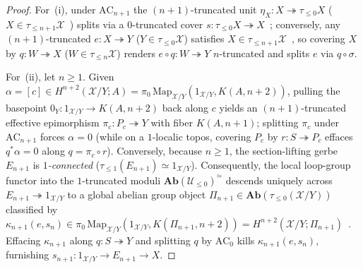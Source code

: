 \documentclass[10pt,twoside,openright]{book}
\theoremstyle{crmplain}
\theoremstyle{crmdef}
\theoremstyle{crmremark}
\begin{document}
\begin{proof}
For~(i), under $\mathrm{AC}_{n+1}$ the $(n+1)$-truncated unit $\eta_X : X \twoheadrightarrow \tau_{\le 0}X$ ($X \in \tau_{\le n+1}\mathcal{X}$~\cite[Lemma~5.5.6.15]{Lurie09}) splits via a $0$-truncated cover $s : \tau_{\le 0}X \twoheadrightarrow X$~\cite[Prop.~7.2.1.14]{Lurie09}; conversely, any $(n+1)$-truncated $e : X \twoheadrightarrow Y$ ($Y \in \tau_{\le 0}\mathcal{X}$) satisfies $X \in \tau_{\le n+1}\mathcal{X}$~\cite[Lemma~5.5.6.14]{Lurie09}, so covering $X$ by $q : W \twoheadrightarrow X$ ($W \in \tau_{\le n}\mathcal{X}$) renders $e \circ q : W \twoheadrightarrow Y$ $n$-truncated and splits $e$ via $q \circ \sigma$.

For~(ii), let $n \ge 1$. Given $\alpha = [c] \in H^{n+2}(\mathcal{X}/Y; A) =\allowbreak \pi_0\,\mathrm{Map}_{\mathcal{X}/Y}(1_{\mathcal{X}/Y},\allowbreak K(A, n+2))$, pulling the basepoint $0_Y : 1_{\mathcal{X}/Y} \to K(A, n+2)$ back along $c$ yields an $(n+1)$-truncated effective epimorphism $\pi_c : P_c \twoheadrightarrow Y$ with fiber $K(A, n+1)$; splitting $\pi_c$ under $\mathrm{AC}_{n+1}$ forces $\alpha = 0$ (while on a $1$-localic topos, covering $P_c$ by $r : S \twoheadrightarrow P_c$ effaces $q^*\alpha = 0$ along $q = \pi_c \circ r$). Conversely, because $n \ge 1$, the section-lifting gerbe $E_{n+1}$ is \emph{$1$-connected} ($\tau_{\le 1}(E_{n+1}) \simeq 1_{\mathcal{X}/Y}$). Consequently, the local loop-group functor into the $1$-truncated moduli $\mathbf{Ab}(\mathcal{U}_{\le 0})^\simeq$ descends uniquely across $E_{n+1} \twoheadrightarrow 1_{\mathcal{X}/Y}$ to a global abelian group object $\Pi_{n+1} \in \mathbf{Ab}(\tau_{\le 0}(\mathcal{X}/Y))$ classified by $\kappa_{n+1}(e, s_n) \in\allowbreak \pi_0\,\mathrm{Map}_{\mathcal{X}/Y}(1_{\mathcal{X}/Y},\allowbreak K(\Pi_{n+1}, n+2)) =\allowbreak H^{n+2}(\mathcal{X}/Y;\allowbreak \Pi_{n+1})$~\cite[Constr.~7.2.2.21, Thm.~7.2.2.26]{Lurie09}. Effacing $\kappa_{n+1}$ along $q : S \twoheadrightarrow Y$ and splitting $q$ by $\mathrm{AC}_0$ kills $\kappa_{n+1}(e, s_n)$, furnishing $s_{n+1} : 1_{\mathcal{X}/Y} \to E_{n+1} \to X$.


\end{proof}
\end{document}
